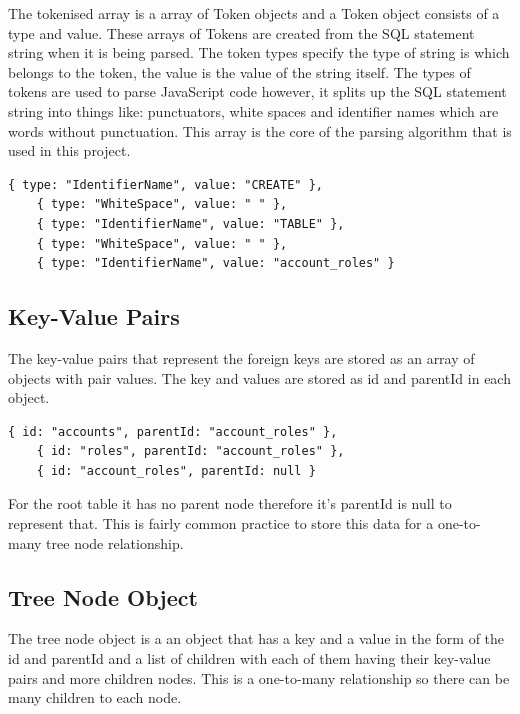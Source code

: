 The tokenised array is a array of Token objects and a Token object consists of a type and value. These arrays of Tokens are created from the SQL statement string when it is being parsed. The token types specify the type of string is which belongs to the token, the value is the value of the string itself. The types of tokens are used to parse JavaScript code however, it splits up the SQL statement string into things like: punctuators, white spaces and identifier names which are words without punctuation. This array is the core of the parsing algorithm that is used in this project.

 \begin{lstlisting}[style=JavaScript, caption={Tokenised array of tokens from a part of a simple input of an "CREATE TABLE" statement.}]
	{ type: "IdentifierName", value: "CREATE" },
	{ type: "WhiteSpace", value: " " },
	{ type: "IdentifierName", value: "TABLE" },
	{ type: "WhiteSpace", value: " " },
	{ type: "IdentifierName", value: "account_roles" }
\end{lstlisting}

\subsection{Key-Value Pairs}

The key-value pairs that represent the foreign keys are stored as an array of objects with pair values. The key and values are stored as id and parentId in each object.

 \begin{lstlisting}[style=JavaScript, caption={Representation of the array of objects containing the key-value pairs.}]
	{ id: "accounts", parentId: "account_roles" },
	{ id: "roles", parentId: "account_roles" },
	{ id: "account_roles", parentId: null }
\end{lstlisting}

For the root table it has no parent node therefore it's parentId is null to represent that. This is fairly common practice to store this data for a one-to-many tree node relationship.

\subsection{Tree Node Object}

The tree node object is a an object that has a key and a value in the form of the id and parentId and a list of children with each of them having their key-value pairs and more children nodes. This is a one-to-many relationship so there can be many children to each node.

